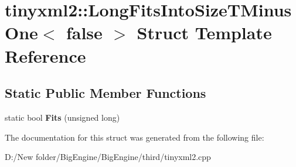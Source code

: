 \hypertarget{structtinyxml2_1_1_long_fits_into_size_t_minus_one_3_01false_01_4}{}\section{tinyxml2\+:\+:Long\+Fits\+Into\+Size\+T\+Minus\+One$<$ false $>$ Struct Template Reference}
\label{structtinyxml2_1_1_long_fits_into_size_t_minus_one_3_01false_01_4}
\subsection*{Static Public Member Functions}
\begin{DoxyCompactItemize}
\item 
\mbox{\label{structtinyxml2_1_1_long_fits_into_size_t_minus_one_3_01false_01_4_a29b01087f38a951276df69d358dc0764}} 
static bool {\bfseries Fits} (unsigned long)
\end{DoxyCompactItemize}


The documentation for this struct was generated from the following file\+:\begin{DoxyCompactItemize}
\item 
D\+:/\+New folder/\+Big\+Engine/\+Big\+Engine/third/tinyxml2.\+cpp\end{DoxyCompactItemize}
